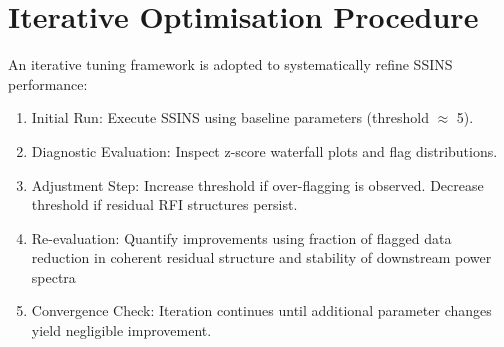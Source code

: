 \documentclass{article}
\begin{document}


\section{Iterative Optimisation Procedure}
An iterative tuning framework is adopted to systematically refine SSINS performance:
\begin{enumerate}
\item Initial Run: Execute SSINS using baseline parameters (threshold $\approx$ 5).
\item Diagnostic Evaluation: Inspect z-score waterfall plots and flag distributions.
\item Adjustment Step:
Increase threshold if over-flagging is observed.
Decrease threshold if residual RFI structures persist.
\item Re-evaluation: Quantify improvements using
fraction of flagged data
reduction in coherent residual structure  and stability of downstream power spectra
\item Convergence Check: Iteration continues until additional parameter changes yield negligible improvement.
\end{enumerate}
\end{document}
